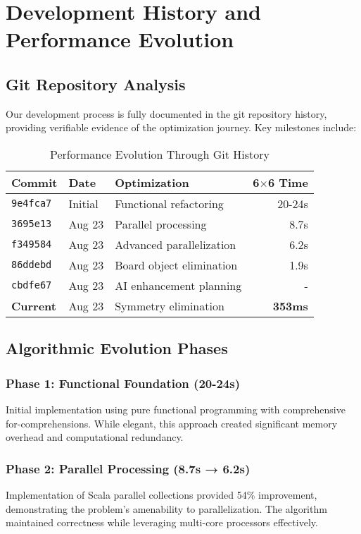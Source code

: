 \documentclass[12pt,a4paper]{article}
\theoremstyle{definition}
\begin{document}
\section{Development History and Performance Evolution}

\subsection{Git Repository Analysis}

Our development process is fully documented in the git repository history, providing verifiable evidence of the optimization journey. Key milestones include:

\begin{table}[h]
\centering
\caption{Performance Evolution Through Git History}
\begin{tabular}{@{}lllr@{}}
\toprule
Commit & Date & Optimization & 6$\times$6 Time \\
\midrule
\texttt{9e4fca7} & Initial & Functional refactoring & 20-24s \\
\texttt{3695e13} & Aug 23 & Parallel processing & 8.7s \\
\texttt{f349584} & Aug 23 & Advanced parallelization & 6.2s \\
\texttt{86ddebd} & Aug 23 & Board object elimination & 1.9s \\
\texttt{cbdfe67} & Aug 23 & AI enhancement planning & - \\
\textbf{Current} & Aug 23 & Symmetry elimination & \textbf{353ms} \\
\bottomrule
\end{tabular}
\end{table}

\subsection{Algorithmic Evolution Phases}

\subsubsection{Phase 1: Functional Foundation (20-24s)}
Initial implementation using pure functional programming with comprehensive for-comprehensions. While elegant, this approach created significant memory overhead and computational redundancy.

\subsubsection{Phase 2: Parallel Processing (8.7s → 6.2s)}
Implementation of Scala parallel collections provided 54\% improvement, demonstrating the problem's amenability to parallelization. The algorithm maintained correctness while leveraging multi-core processors effectively.
\end{document}
